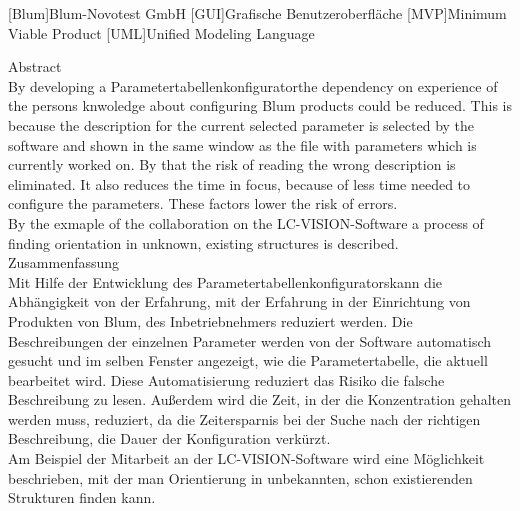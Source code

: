 \documentclass[12pt,a4paper]{article}
\begin{document}
\begin{acronym}[Abkürzungsverzeichnis]
[Blum]{Blum-Novotest GmbH}
[GUI]{Grafische Benutzeroberfläche}
[MVP]{Minimum Viable Product}
[UML]{Unified Modeling Language}
\end{acronym}
\newpage
\thispagestyle{empty}
\listoffigures
\newpage\setcounter{page}{1}\noindent
{\Large Abstract}\\\newline
\noindent
By developing a \glqq Parametertabellenkonfigurator\grqq\space the dependency on experience of the persons knwoledge about configuring Blum products could be reduced. This is because the description for the current selected parameter is selected by the software and shown in the same window as the file with parameters which is currently worked on. By that the risk of reading the wrong description is eliminated. It also reduces the time in focus, because of less time needed to configure the parameters. These factors lower the risk of errors.\\
By the exmaple of the collaboration on the \glqq LC-VISION\grqq -Software a process of finding orientation in unknown, existing structures is described.\\
\newline
\noindent
{\Large Zusammenfassung}\\
\newline
Mit Hilfe der Entwicklung des \glqq Parametertabellenkonfigurators\grqq kann die Abhängigkeit von der Erfahrung, mit der Erfahrung in der Einrichtung von Produkten von Blum, des Inbetriebnehmers reduziert werden. Die Beschreibungen der einzelnen Parameter werden von der Software automatisch gesucht und im selben Fenster angezeigt, wie die Parametertabelle, die aktuell bearbeitet wird. Diese Automatisierung reduziert das Risiko die falsche Beschreibung zu lesen. Außerdem wird die Zeit, in der die Konzentration gehalten werden muss, reduziert, da die Zeitersparnis bei der Suche nach der richtigen Beschreibung, die Dauer der Konfiguration verkürzt.\\
Am Beispiel der Mitarbeit an der \glqq LC-VISION\grqq -Software wird eine Möglichkeit beschrieben, mit der man Orientierung in unbekannten, schon existierenden Strukturen finden kann.
\noindent

\newpage   
\end{document}
